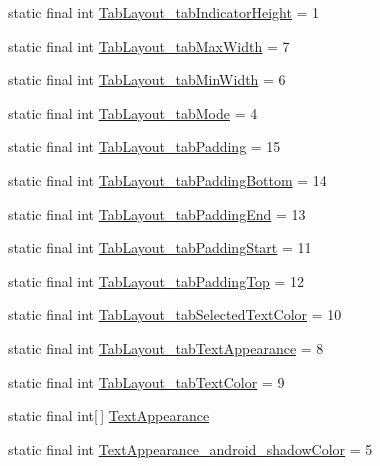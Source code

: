 \begin{CompactItemize}
\item 
static final int \hyperlink{classandroid_1_1support_1_1v4_1_1_r_1_1styleable_be8e5fea2ebe1b6d9d9aa4cca6549e78}{TabLayout\_\-tabIndicatorHeight} = 1
\item 
static final int \hyperlink{classandroid_1_1support_1_1v4_1_1_r_1_1styleable_8e0718dd07664eb909dcf60018ef5c49}{TabLayout\_\-tabMaxWidth} = 7
\item 
static final int \hyperlink{classandroid_1_1support_1_1v4_1_1_r_1_1styleable_4b4566378cac3b5013ed493236349b6d}{TabLayout\_\-tabMinWidth} = 6
\item 
static final int \hyperlink{classandroid_1_1support_1_1v4_1_1_r_1_1styleable_87f917746f24bf8503296b15435b51c7}{TabLayout\_\-tabMode} = 4
\item 
static final int \hyperlink{classandroid_1_1support_1_1v4_1_1_r_1_1styleable_4298aad07907a00ae8fb09582886b5c7}{TabLayout\_\-tabPadding} = 15
\item 
static final int \hyperlink{classandroid_1_1support_1_1v4_1_1_r_1_1styleable_52f17fc2c908e7fc2d72f48472b4125e}{TabLayout\_\-tabPaddingBottom} = 14
\item 
static final int \hyperlink{classandroid_1_1support_1_1v4_1_1_r_1_1styleable_ed971a95ce0c06adb144c8d88ab0fe8f}{TabLayout\_\-tabPaddingEnd} = 13
\item 
static final int \hyperlink{classandroid_1_1support_1_1v4_1_1_r_1_1styleable_1a5292e1b40f0fa300a0dbb3286373d6}{TabLayout\_\-tabPaddingStart} = 11
\item 
static final int \hyperlink{classandroid_1_1support_1_1v4_1_1_r_1_1styleable_1bbc5410da0ccdca7252583408dbbb6a}{TabLayout\_\-tabPaddingTop} = 12
\item 
static final int \hyperlink{classandroid_1_1support_1_1v4_1_1_r_1_1styleable_7c1ab99e50a37a18c9bf0c809debb859}{TabLayout\_\-tabSelectedTextColor} = 10
\item 
static final int \hyperlink{classandroid_1_1support_1_1v4_1_1_r_1_1styleable_411f9a9c12b8ed9f61f5cb57536ee912}{TabLayout\_\-tabTextAppearance} = 8
\item 
static final int \hyperlink{classandroid_1_1support_1_1v4_1_1_r_1_1styleable_67777f9a649ba213b12bd3b8176c975f}{TabLayout\_\-tabTextColor} = 9
\item 
static final int\mbox{[}$\,$\mbox{]} \hyperlink{classandroid_1_1support_1_1v4_1_1_r_1_1styleable_958f0ff7225bca693e30641e14dd4569}{TextAppearance}
\item 
static final int \hyperlink{classandroid_1_1support_1_1v4_1_1_r_1_1styleable_18256235d0d912eac257e48967b04d1e}{TextAppearance\_\-android\_\-shadowColor} = 5

\end{CompactItemize}
